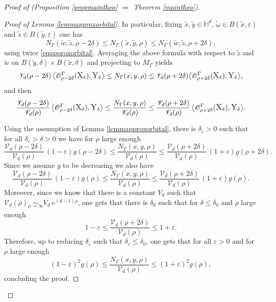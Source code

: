 \documentclass[10pt]{amsart}
\let\mathcal\mathscr
\let\epsilon\varepsilon
\theoremstyle{plain}
\theoremstyle{definition}
\newcommand{\equivaut}[1]{\underset{#1}{\sim}}
\begin{document}
\begin{proof}[Proof of (Proposition \ref{propmaintheo} $\Rightarrow$ Theorem \ref{maintheo})]
\begin{proof}[Proof of Lemma \ref{lemmapproxorbital}]
\noindent
In particular, fixing $\tilde{x},\tilde{y} \in \mathbb{H}^d$, $ \tilde{\omega} \in B(\tilde{x},\epsilon)$ and $\tilde{z} \in B(\tilde{y},\epsilon)$ one has
\[
N_{\Gamma}(\tilde{w},\tilde{z}, \rho - 2 \delta) \le N_{\Gamma}(\tilde{x},\tilde{y}, \rho) \le N_{\Gamma}(\tilde{w},\tilde{z}, \rho + 2 \delta),
\]
using twice \eqref{eqapproxorbital}. Averaging the above formula with respect to $\tilde{z}$ and $\tilde{w}$ on $B(\tilde{y},\delta) \times B(\tilde{x},\delta) $ and projecting to $M_{\Gamma}$ yields
\[
\mathcal{V}_d(\rho - 2 \delta) \left< \mathcal{O}^{\Gamma}_{\rho - 2 \delta}(\text{\large{X}}_{\delta}), \text{\large{Y}}_{\delta} \right> \le N_{\Gamma}(x,y,\rho) \le \mathcal{V}_d(\rho + 2 \delta) \bigl< \mathcal{O}^{\Gamma}_{\rho + 2 \delta}(\text{\large{X}}_{\delta}), \text{\large{Y}}_{\delta} \bigr>,
\]
and then
\[
\frac{\mathcal{V}_d(\rho - 2 \delta)}{\mathcal{V}_d(\rho)} \left< \mathcal{O}^{\Gamma}_{\rho - 2 \delta}(\text{\large{X}}_{\delta}), \text{\large{Y}}_{\delta} \right> \le \frac{N_{\Gamma}(x,y,\rho)}{\mathcal{V}_d(\rho)} \le \frac{\mathcal{V}_d(\rho + 2 \delta)}{\mathcal{V}_d(\rho)}\, \bigl< \mathcal{O}^{\Gamma}_{\rho + 2 \delta}(\text{\large{X}}_{\delta}), \text{\large{Y}}_{\delta} \bigr>.
\]

Using the assumption of Lemma \ref{lemmapproxorbital}, there is $\delta_{\epsilon} > 0$ such that for all $\delta_{\epsilon} >\delta > 0$ we have for $\rho$ large enough
\[
\frac{\mathcal{V}_d(\rho - 2 \delta)}{\mathcal{V}_d(\rho)}\, (1 - \epsilon) g(\rho - 2 \delta) \le \frac{ N_{\Gamma}(x,y,\rho)}{\mathcal{V}_d(\rho)} \le \frac{\mathcal{V}_d(\rho + 2 \delta)}{\mathcal{V}_d(\rho)}\, (1 + \epsilon) g (\rho + 2 \delta).
\]
Since we assume $g$ to be decreasing we also have
\[
\frac{\mathcal{V}_d(\rho - 2 \delta)}{\mathcal{V}_d(\rho)}\, (1 - \epsilon) g(\rho) \le \frac{ N_{\Gamma}(x,y,\rho)}{\mathcal{V}_d(\rho)} \le \frac{\mathcal{V}_d(\rho + 2 \delta)}{\mathcal{V}_d(\rho)}\, (1 + \epsilon) g (\rho).
\]
Moreover, since we know that there is a constant $V_d$ such that $\mathcal{V}_d(\rho) \equivaut{\rho \to \infty} V_d \ e^{(d-1) \rho}$, one gets that there is $\delta_0$ such that for $\delta \le \delta_0$ and $\rho$ large enough
\[
1 - \epsilon \le \frac{\mathcal{V}_d(\rho + 2 \delta)}{\mathcal{V}_d(\rho)} \le 1 + \epsilon.
\]
Therefore, up to reducing $\delta_{\epsilon}$ such that $\delta_{\epsilon} \le \delta_0$, one gets that for all $\epsilon > 0$ and for $\rho$ large enough
\[
(1 - \epsilon)^2 g(\rho) \le \frac{ N_{\Gamma}(x,y,\rho)}{\mathcal{V}_d(\rho)} \le (1 + \epsilon)^2 g (\rho),
\]
concluding the proof.
\end{proof}


\end{proof}
\end{document}
